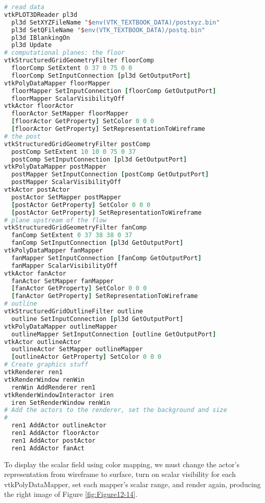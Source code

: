 \begin{lstlisting}[language=TCL, caption={Display the computational grid.}]
# read data
vtkPLOT3DReader pl3d
  pl3d SetXYZFileName "$env(VTK_TEXTBOOK_DATA)/postxyz.bin"
  pl3d SetQFileName "$env(VTK_TEXTBOOK_DATA)/postq.bin"
  pl3d IBlankingOn
  pl3d Update
# computational planes: the floor
vtkStructuredGridGeometryFilter floorComp
  floorComp SetExtent 0 37 0 75 0 0
  floorComp SetInputConnection [pl3d GetOutputPort]
vtkPolyDataMapper floorMapper
  floorMapper SetInputConnection [floorComp GetOutputPort]
  floorMapper ScalarVisibilityOff
vtkActor floorActor
  floorActor SetMapper floorMapper
  [floorActor GetProperty] SetColor 0 0 0
  [floorActor GetProperty] SetRepresentationToWireframe
# the post
vtkStructuredGridGeometryFilter postComp
  postComp SetExtent 10 10 0 75 0 37
  postComp SetInputConnection [pl3d GetOutputPort]
vtkPolyDataMapper postMapper
  postMapper SetInputConnection [postComp GetOutputPort]
  postMapper ScalarVisibilityOff
vtkActor postActor
  postActor SetMapper postMapper
  [postActor GetProperty] SetColor 0 0 0
  [postActor GetProperty] SetRepresentationToWireframe
# plane upstream of the flow
vtkStructuredGridGeometryFilter fanComp
  fanComp SetExtent 0 37 38 38 0 37
  fanComp SetInputConnection [pl3d GetOutputPort]
vtkPolyDataMapper fanMapper
  fanMapper SetInputConnection [fanComp GetOutputPort]
  fanMapper ScalarVisibilityOff
vtkActor fanActor
  fanActor SetMapper fanMapper
  [fanActor GetProperty] SetColor 0 0 0
  [fanActor GetProperty] SetRepresentationToWireframe
# outline
vtkStructuredGridOutlineFilter outline
  outline SetInputConnection [pl3d GetOutputPort]
vtkPolyDataMapper outlineMapper
  outlineMapper SetInputConnection [outline GetOutputPort]
vtkActor outlineActor
  outlineActor SetMapper outlineMapper
  [outlineActor GetProperty] SetColor 0 0 0
# Create graphics stuff
vtkRenderer ren1
vtkRenderWindow renWin
  renWin AddRenderer ren1
vtkRenderWindowInteractor iren
  iren SetRenderWindow renWin
# Add the actors to the renderer, set the background and size
#
  ren1 AddActor outlineActor
  ren1 AddActor floorActor
  ren1 AddActor postActor
  ren1 AddActor fanAct
\end{lstlisting}

To display the scalar field using color mapping, we must change the
actor's representation from wireframe to surface, turn on scalar
visibility for each vtkPolyDataMapper, set each mapper's scalar
range, and render again, producing the right image of Figure \ref{fig:Figure12-14}.

